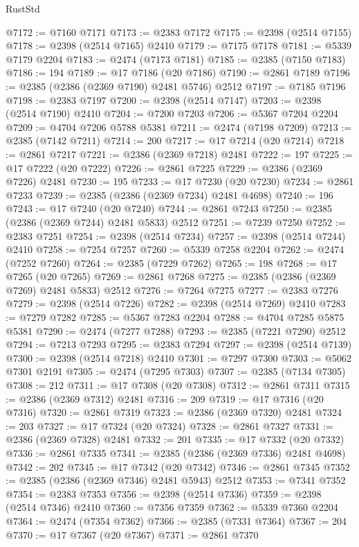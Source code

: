 \begin{lexlean}{RustStd}
\begin{coremodule}
{\begin{coremodule}
{{{{{{{{{{{{{{{{{{{{{{{{{{{{{{{{{{{{{{{{{{{{{{{{{{@7172 := @7160 @7171
@7173 := @2383 @7172
@7175 := @2398 (@2514 @7155)
@7178 := @2398 (@2514 @7165) @2410
@7179 := @7175 @7178
@7181 := @5339 @7179 @2204
@7183 := @2474 (@7173 @7181)
@7185 := @2385 (@7150 @7183)
@7186 := 194
@7189 := @17 @7186 (@20 @7186)
@7190 := @2861 @7189
@7196 := @2385 (@2386 (@2369 @7190) @2481 @5746) @2512
@7197 := @7185 @7196
@7198 := @2383 @7197
@7200 := @2398 (@2514 @7147)
@7203 := @2398 (@2514 @7190) @2410
@7204 := @7200 @7203
@7206 := @5367 @7204 @2204
@7209 := @4704 @7206 @5788 @5381
@7211 := @2474 (@7198 @7209)
@7213 := @2385 (@7142 @7211)
@7214 := 200
@7217 := @17 @7214 (@20 @7214)
@7218 := @2861 @7217
@7221 := @2386 (@2369 @7218) @2481
@7222 := 197
@7225 := @17 @7222 (@20 @7222)
@7226 := @2861 @7225
@7229 := @2386 (@2369 @7226) @2481
@7230 := 195
@7233 := @17 @7230 (@20 @7230)
@7234 := @2861 @7233
@7239 := @2385 (@2386 (@2369 @7234) @2481 @4698)
@7240 := 196
@7243 := @17 @7240 (@20 @7240)
@7244 := @2861 @7243
@7250 := @2385 (@2386 (@2369 @7244) @2481 @5833) @2512
@7251 := @7239 @7250
@7252 := @2383 @7251
@7254 := @2398 (@2514 @7234)
@7257 := @2398 (@2514 @7244) @2410
@7258 := @7254 @7257
@7260 := @5339 @7258 @2204
@7262 := @2474 (@7252 @7260)
@7264 := @2385 (@7229 @7262)
@7265 := 198
@7268 := @17 @7265 (@20 @7265)
@7269 := @2861 @7268
@7275 := @2385 (@2386 (@2369 @7269) @2481 @5833) @2512
@7276 := @7264 @7275
@7277 := @2383 @7276
@7279 := @2398 (@2514 @7226)
@7282 := @2398 (@2514 @7269) @2410
@7283 := @7279 @7282
@7285 := @5367 @7283 @2204
@7288 := @4704 @7285 @5875 @5381
@7290 := @2474 (@7277 @7288)
@7293 := @2385 (@7221 @7290) @2512
@7294 := @7213 @7293
@7295 := @2383 @7294
@7297 := @2398 (@2514 @7139)
@7300 := @2398 (@2514 @7218) @2410
@7301 := @7297 @7300
@7303 := @5062 @7301 @2191
@7305 := @2474 (@7295 @7303)
@7307 := @2385 (@7134 @7305)
@7308 := 212
@7311 := @17 @7308 (@20 @7308)
@7312 := @2861 @7311
@7315 := @2386 (@2369 @7312) @2481
@7316 := 209
@7319 := @17 @7316 (@20 @7316)
@7320 := @2861 @7319
@7323 := @2386 (@2369 @7320) @2481
@7324 := 203
@7327 := @17 @7324 (@20 @7324)
@7328 := @2861 @7327
@7331 := @2386 (@2369 @7328) @2481
@7332 := 201
@7335 := @17 @7332 (@20 @7332)
@7336 := @2861 @7335
@7341 := @2385 (@2386 (@2369 @7336) @2481 @4698)
@7342 := 202
@7345 := @17 @7342 (@20 @7342)
@7346 := @2861 @7345
@7352 := @2385 (@2386 (@2369 @7346) @2481 @5943) @2512
@7353 := @7341 @7352
@7354 := @2383 @7353
@7356 := @2398 (@2514 @7336)
@7359 := @2398 (@2514 @7346) @2410
@7360 := @7356 @7359
@7362 := @5339 @7360 @2204
@7364 := @2474 (@7354 @7362)
@7366 := @2385 (@7331 @7364)
@7367 := 204
@7370 := @17 @7367 (@20 @7367)
@7371 := @2861 @7370
}}}}}}}}}}}}}}}}}}}}}}}}}}}}}}}}}}}}}}}}}}}}}}}}}}
\end{coremodule}}
\end{coremodule}
\end{lexlean}
